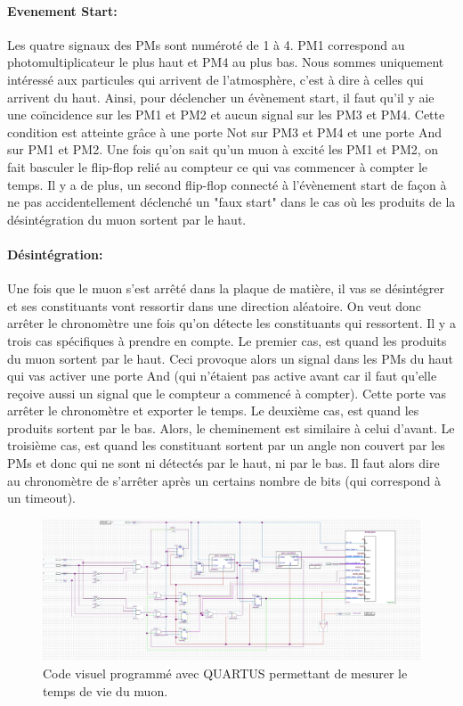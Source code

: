 \documentclass[12pt]{article}
\begin{document}
\paragraph{Evenement Start:}
Les quatre signaux des PMs sont numéroté de 1 à 4. PM1 correspond au photomultiplicateur le plus haut et PM4 au plus bas. Nous sommes uniquement intéressé aux particules qui arrivent de l'atmosphère, c'est à dire à celles qui arrivent du haut. Ainsi, pour déclencher un évènement start, il faut qu'il y aie une coïncidence sur les PM1 et PM2 et aucun signal sur les PM3 et PM4. Cette condition est atteinte grâce à une porte Not sur PM3 et PM4 et une porte And sur PM1 et PM2. Une fois qu'on sait qu'un muon à excité les PM1 et PM2, on fait basculer le flip-flop relié au compteur ce qui vas commencer à compter le temps. Il y a de plus, un second flip-flop connecté à l'évènement start de façon à ne pas accidentellement déclenché un "faux start" dans le cas où les produits de la désintégration du muon sortent par le haut.

\paragraph{Désintégration:}
Une fois que le muon s'est arrêté dans la plaque de matière, il vas se désintégrer et ses constituants vont ressortir dans une direction aléatoire. On veut donc arrêter le chronomètre une fois qu'on détecte les constituants qui ressortent. Il y a trois cas spécifiques à prendre en compte. Le premier cas, est quand les produits du muon sortent par le haut. Ceci provoque alors un signal dans les PMs du haut qui vas activer une porte And (qui n'étaient pas active avant car il faut qu'elle reçoive aussi un signal que le compteur a commencé à compter). Cette porte vas arrêter le chronomètre et exporter le temps. Le deuxième cas, est quand les produits sortent par le bas. Alors, le cheminement est similaire à celui d'avant. Le troisième cas, est quand les constituant sortent par un angle non couvert par les PMs et donc qui ne sont ni détectés par le haut, ni par le bas. Il faut alors dire au chronomètre de s'arrêter après un certains nombre de bits (qui correspond à un timeout).

\begin{figure}[!ht]
    \centering
    \includegraphics[width=1\textwidth]{Images/Schemas/Quartus.jpg}
    \caption{Code visuel programmé avec QUARTUS permettant de mesurer le temps de vie du muon.}
    \label{fig:Quartus}
\end{figure}
\end{document}
